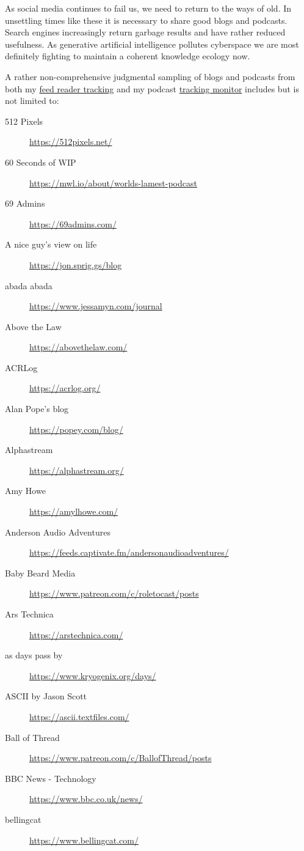 As social media continues to fail us, we need to return to the ways of
old. In unsettling times like these it is necessary to share good blogs
and podcasts. Search engines increasingly return garbage results and
have rather reduced usefulness. As generative artificial intelligence
pollutes cyberspace we are most definitely fighting to maintain a
coherent knowledge ecology now.

A rather non-comprehensive judgmental sampling of blogs and podcasts
from both my
\href{https://code.launchpad.net/~skellat/+git/FeedReadingFeeds}{feed
reader tracking} and my podcast
\href{https://code.launchpad.net/~skellat/+git/Podcasting}{tracking
monitor} includes but is not limited to:

\begin{description}
  \item[512 Pixels] \url{https://512pixels.net/}
  \item[60 Seconds of WIP] \url{https://mwl.io/about/worlds-lamest-podcast} 
  \item[69 Admins] \url{https://69admins.com/}
  \item[A nice guy's view on life] \url{https://jon.sprig.gs/blog}
  \item[abada abada] \url{https://www.jessamyn.com/journal}
  \item[Above the Law] \url{https://abovethelaw.com/}
  \item[ACRLog] \url{https://acrlog.org/}
  \item[Alan Pope's blog] \url{https://popey.com/blog/}
  \item[Alphastream] \url{https://alphastream.org/}
  \item[Amy Howe] \url{https://amylhowe.com/}
  \item[Anderson Audio Adventures] \url{https://feeds.captivate.fm/andersonaudioadventures/} \item[Baby Beard Media] \url{https://www.patreon.com/c/roletocast/posts}
  \item[Ars Technica] \url{https://arstechnica.com/}
  \item[as days pass by] \url{https://www.kryogenix.org/days/}
  \item[ASCII by Jason Scott] \url{https://ascii.textfiles.com/}
  \item[Ball of Thread] \url{https://www.patreon.com/c/BallofThread/posts}
  \item[BBC News - Technology] \url{https://www.bbc.co.uk/news/}
  \item[bellingcat] \url{https://www.bellingcat.com/}

\end{description}

